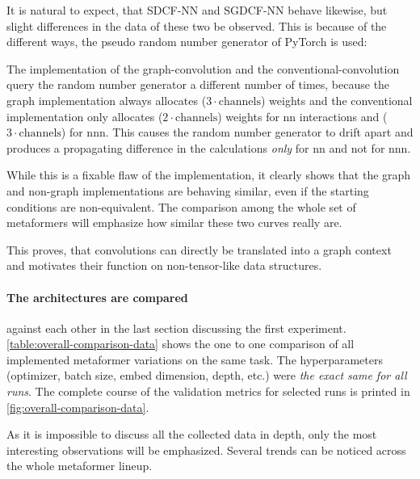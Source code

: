 It is natural to expect, that SDCF-NN and SGDCF-NN behave likewise, but slight differences in the data of these two be observed.
This is because of the different ways, the pseudo random number generator of PyTorch is used:
\begin{sloppypar} %
    The implementation of the graph-convolution \phantom{asdasdasdasdasdasdasdasdasdasdasdasdasd}
    and the conventional-convolution 
        \phantom{aa}
        query the random number generator a different number of times, because the graph implementation always allocates ($3 \cdot \mathrm{channels}$) weights and the conventional implementation only allocates ($2 \cdot \mathrm{channels}$) weights for nn interactions and ($3 \cdot \mathrm{channels}$) for nnn.
        This causes the random number generator to drift apart and produces a propagating difference in the calculations \emph{only} for nn and not for nnn.
\end{sloppypar}

While this is a fixable flaw of the implementation, it clearly shows that the graph and non-graph implementations are behaving similar, even if the starting conditions are non-equivalent.
The comparison among the whole set of metaformers will emphasize how similar these two curves really are.

This proves, that convolutions can directly be translated into a graph context and motivates their function on non-tensor-like data structures.

\FloatBarrier
\paragraph{The architectures are compared} against each other in the last section discussing the first experiment. 
\autoref{table:overall-comparison-data} shows the one to one comparison of all implemented metaformer variations on the same task.
The hyperparameters (optimizer, batch size, embed dimension, depth, etc.) were \emph{the exact same for all runs}. 
The complete course of the validation metrics for selected runs is printed in \autoref{fig:overall-comparison-data}.

As it is impossible to discuss all the collected data in depth, only the most interesting observations will be emphasized.
Several trends can be noticed across the whole metaformer lineup. 



